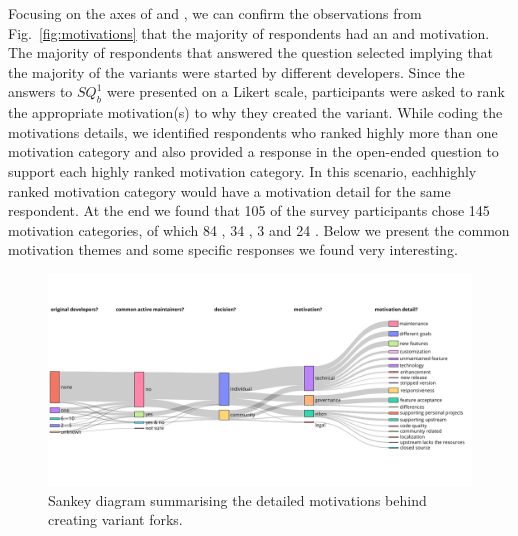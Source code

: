 Focusing on the axes of  and , we can confirm the observations from Fig.~\ref{fig:motivations} that the majority of respondents had an  and  motivation.
The majority of respondents that answered the question  selected  implying that the majority of the variants were started by different developers.
Since the answers to $SQ^1_{b}$ were presented on a Likert scale,%
participants were asked to rank the appropriate motivation(s) to why they created the variant. While coding the motivations details, we identified respondents who ranked highly more than one motivation category and also provided a response in the open-ended question to support each highly ranked motivation category. In this scenario, eachhighly ranked motivation category would have a motivation detail for the same respondent. %
At the end we found that 105 of the survey participants chose 145 motivation categories, of which 84 , 34 , 3  and 24 . Below we present the common motivation themes and some  specific responses we found very
interesting.

\begin{figure}[ht]
\begin{center}
    \centering
    \includegraphics[width=\textwidth]{pdfs/sankey_motivations_2.pdf}
    \caption{Sankey diagram summarising the detailed motivations behind creating variant forks.
    }
    \label{fig:sankey_motivation}
\end{center}
\vspace{-.3cm}
\end{figure}

